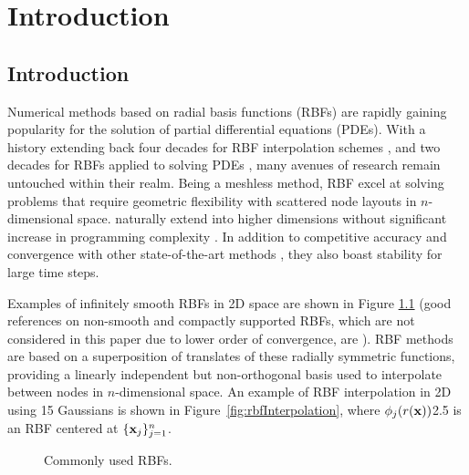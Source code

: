 
\chapter{Introduction}

\section{Introduction}
\label{sec:intro}

Numerical methods based on radial basis functions (RBFs) are rapidly gaining popularity for the solution of partial differential equations (PDEs). With a history extending back four decades for RBF interpolation schemes \cite{Hardy1971}, and two decades for RBFs applied to solving PDEs \cite{Kansa1990a}, many avenues of research remain untouched within their realm. Being a meshless method, RBF  excel at solving problems that require geometric flexibility with scattered node layouts in $n$-dimensional space.  naturally extend into higher dimensions without significant increase in programming complexity \cite{FlyerWright07,WrightFlyerYuen10}. In addition to competitive accuracy and convergence  with other state-of-the-art methods \cite{FlyerWright07, FlyerWright09, FlyerLehto10, WrightFlyerYuen10, FlyerFornberg11}, they also boast stability for large time steps.

Examples of infinitely smooth RBFs in 2D space are shown in Figure \ref{fig:rbfs} (good references on non-smooth and compactly supported RBFs, which are not considered in this paper due to lower order of convergence, are \cite{BuhmannBook,WendlandBook}). RBF methods are based on a superposition of translates of these radially symmetric functions, providing a linearly independent but non-orthogonal basis used to interpolate between nodes in $n$-dimensional space. An example of RBF interpolation in 2D using 15 Gaussians is shown in Figure~\ref{fig:rbfInterpolation}, where 
   {$\phi_j(r(\mathbf{x}))$}{2.5}
is an RBF centered at $\{\mathbf{x}_j\}_{j=1}^{n}$. 

\begin{figure}[ht]
    \centering
    \caption{Commonly used RBFs.}
    \label{fig:rbfs}
\end{figure}


